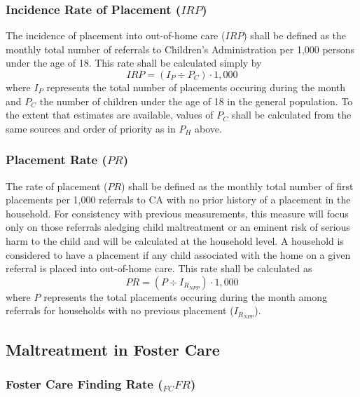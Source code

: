 \documentclass[12pt]{article}\usepackage[]{graphicx}\usepackage[]{color}
\begin{document}
\subsubsection{Incidence Rate of Placement ($IRP$)}

The incidence of placement into out-of-home care ($IRP$) shall be defined as the monthly total number of referrals to Children's Administration per 1,000 persons under the age of 18. This rate shall be calculated simply by 
\begin{equation}\label{eq:IRP}
IRP = (I_P \div P_C) \cdot 1,000
\end{equation}
where $I_P$ represents the total number of placements occuring during the month and $P_C$ the number of children under the age of 18 in the general population. To the extent that estimates are available, values of $P_C$ shall be calculated from the same sources and order of priority as in $P_H$ above.

\subsubsection{Placement Rate ($PR$)}

The rate of placement ($PR$) shall be defined as the monthly total number of first placements per 1,000 referrals to CA with no prior history of a placement in the household. For consistency with previous measurements, this measure will focus only on those referrals aledging child maltreatment or an eminent risk of serious harm to the child and will be calculated at the household level. A household is considered to have a placement if any child associated with the home on a given referral is placed into out-of-home care. This rate shall be calculated as 
\begin{equation}\label{eq:PR}
PR = (P \div I_{R_{NPP}}) \cdot 1,000
\end{equation}
where $P$ represents the total placements occuring during the month among referrals for households with no previous placement ($I_{R_{NPP}}$). 

\subsection{Maltreatment in Foster Care}

\subsubsection{Foster Care Finding Rate (${}_{FC}FR$)}
\end{document}
